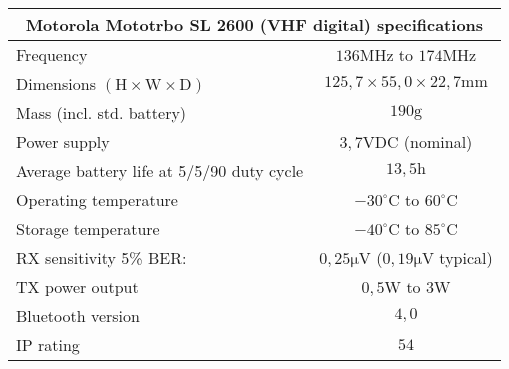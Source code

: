 \footnotesize
\begin{tabular}{|l|c|}
	\hline
	\multicolumn{2}{|c|}{\textbf{Motorola Mototrbo SL 2600 (VHF digital) specifications}} \\
	\hline
 	Frequency & $136\mathrm{MHz}$ to $174\mathrm{MHz}$ \\
 	Dimensions $\mathrm{(H \times W \times D)}$ & $125,7 \times 55,0 \times 22,7 \mathrm{mm}$ \\%
 	Mass (incl. std. battery) & $190\mathrm{g}$ \\%
	Power supply & $3,7\mathrm{VDC}$ (nominal) \\
 	Average battery life at 5/5/90 duty cycle & $13,5\mathrm{h}$ \\
	Operating temperature & $-30^\circ \mathrm{C}$ to $60^\circ \mathrm{C}$ \\
	Storage temperature & $-40^\circ \mathrm{C}$ to $85^\circ \mathrm{C}$ \\
	RX sensitivity 5\% BER: & $0,25\mathrm{\mu V}$ ($0,19\mathrm{\mu V}$ typical) \\
	TX power output & $0,5\mathrm{W}$ to $3\mathrm{W}$ \\
	Bluetooth version & $4,0$\\
	IP rating & $54$\\
	\hline
\end{tabular}